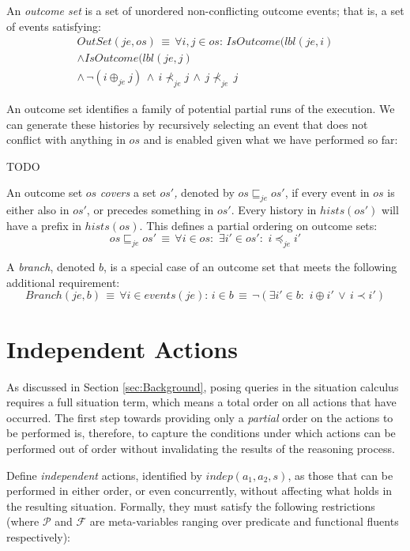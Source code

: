 An \emph{outcome set} is a set of unordered non-conflicting outcome
events; that is, a set of events satisfying:\begin{multline*}
OutSet(je,os)\,\equiv\,\forall i,j\in os:\, IsOutcome(lbl(je,i)\\
\wedge IsOutcome(lbl(je,j)\\
\wedge\,\neg(i\oplus_{je}j)\,\wedge\, i\not\prec_{je}j\,\wedge\, j\not\prec_{je}\, j\end{multline*}


An outcome set identifies a family of potential partial runs of the
execution. We can generate these histories by recursively selecting
an event that does not conflict with anything in $os$ and is enabled
given what we have performed so far:

TODO

An outcome set $os$\emph{ covers} a set \emph{$os'$,} denoted by
$os\sqsubseteq_{je}os'$, if every event in $os$ is either also in
$os'$, or precedes something in $os'$. Every history in $hists(os')$
will have a prefix in $hists(os)$. This defines a partial ordering
on outcome sets:\[
os\sqsubseteq_{je}os'\,\equiv\,\forall i\in os:\,\,\exists i'\in os':\,\, i\preceq_{je}i'\]


A \emph{branch}, denoted $b$, is a special case of an outcome set
that meets the following additional requirement:\[
Branch(je,b)\,\equiv\,\forall i\in events(je):\, i\in b\,\equiv\,\neg(\exists i'\in b:\,\, i\oplus i'\,\vee\, i\prec i')\]



\section{Independent Actions\label{sec:JointExec:IndepActs}}

As discussed in Section \ref{sec:Background}, posing queries in the
situation calculus requires a full situation term, which means a total
order on all actions that have occurred. The first step towards providing
only a \emph{partial} order on the actions to be performed is, therefore,
to capture the conditions under which actions can be performed out
of order without invalidating the results of the reasoning process.

Define \emph{independent} actions, identified by $indep(a_{1},a_{2},s)$,
as those that can be performed in either order, or even concurrently,
without affecting what holds in the resulting situation. Formally,
they must satisfy the following restrictions (where $\mathcal{P}$
and $\mathcal{F}$ are meta-variables ranging over predicate and functional
fluents respectively):

